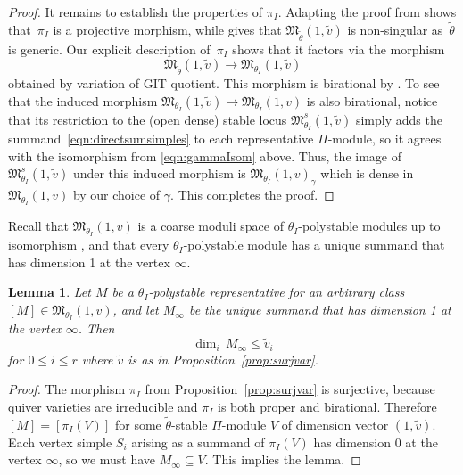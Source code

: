 \documentclass[pdftex]{sigma}%
\newtheorem{Lemma}[Theorem]{Lemma}
\numberwithin{equation}{section}
\begin{document}
\begin{proof}
 It remains to establish the properties of $\pi_I$. Adapting the proof from \cite[Lemma~2.4]{bellamy2016symplectic} shows that~$\pi_I$ is a projective morphism, while \cite[Theorem~1.15]{bellamy2016symplectic} gives that $ \mathfrak{M}_{\widetilde{\theta}}(1,\widetilde{v})$ is non-singular as~$\widetilde{\theta}$ is generic. Our explicit description of~$\pi_I$ shows that it factors via the morphism
\begin{equation*}%
\mathfrak{M}_{\widetilde{\theta}}(1,\widetilde{v}) \to \mathfrak{M}_{\theta_I}(1,\widetilde{v})
\end{equation*}
obtained by variation of GIT quotient. This morphism is birational by \cite[Lemma~2.12]{nakajima2009quiver}. To see that the induced morphism $\mathfrak{M}_{\theta_I}(1,\widetilde{v}) \to \mathfrak{M}_{\theta_I}(1,v)$ is also birational, notice that its restriction to the (open dense) stable locus $\mathfrak{M}^s_{\theta_I}(1,\widetilde{v})$ simply adds the summand~\eqref{eqn:directsumsimples} to each representative $\Pi$-module, so it agrees with the isomorphism from \eqref{eqn:gammaIsom} above. Thus, the image of $\mathfrak{M}^s_{\theta_I}(1,\widetilde{v})$ under this induced morphism is $\mathfrak{M}_{\theta_I}(1,v)_\gamma$ which is dense in $\mathfrak{M}_{\theta_I}(1,v)$ by our choice of $\gamma$. This completes the proof.
 \end{proof}

Recall that $\mathfrak{M}_{\theta_I}(1,v)$ is a coarse moduli space of $\theta_I$-polystable modules up to
isomorphism \cite[Proposition 2.9(2)]{nakajima2009quiver}, and that every $\theta_I$-polystable module has a unique summand that has dimension 1 at the vertex $\infty$.
\begin{Lemma}
\label{lem:vwtildev}
Let $M$ be a $\theta_I$-polystable representative for an arbitrary class $[M] \in \mathfrak{M}_{\theta_I}(1,v)$, and let $M_{\infty}$ be the unique summand that has dimension 1 at the vertex $\infty$.
Then
\[ \dim_i\,M_{\infty} \leq \widetilde{v}_i\]
for $0 \leq i \leq r$ where $\widetilde{v}$ is as in Proposition~{\rm \ref{prop:surjvar}}.
\end{Lemma}
\begin{proof}
{The morphism $\pi_I$ from Proposition~\ref{prop:surjvar} is surjective, because quiver varieties are irreducible and $\pi_I$ is both proper and birational. Therefore $[M]=[\pi_I(V)]$ for some $\tilde{\theta}$-stable $\Pi$-module $V$ of dimension vector $(1,\tilde{v})$. Each vertex simple $S_i$ arising as a summand of $\pi_I(V)$} has dimension 0 at the vertex $\infty$, {so }we must have $M_{\infty} \subseteq {V}$. This implies the lemma.
\end{proof}
\end{document}

